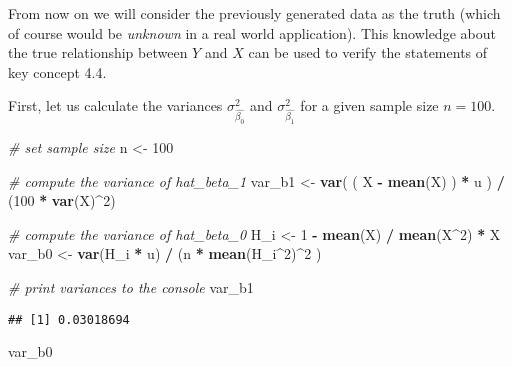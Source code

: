 \documentclass[]{book}
\newenvironment{Shaded}{\begin{snugshade}}{\end{snugshade}}
\newcommand{\KeywordTok}[1]{\textcolor[rgb]{0.13,0.29,0.53}{\textbf{#1}}}
\newcommand{\DecValTok}[1]{\textcolor[rgb]{0.00,0.00,0.81}{#1}}
\newcommand{\StringTok}[1]{\textcolor[rgb]{0.31,0.60,0.02}{#1}}
\newcommand{\CommentTok}[1]{\textcolor[rgb]{0.56,0.35,0.01}{\textit{#1}}}
\newcommand{\OperatorTok}[1]{\textcolor[rgb]{0.81,0.36,0.00}{\textbf{#1}}}
\newcommand{\NormalTok}[1]{#1}
\theoremstyle{definition}
\theoremstyle{definition}
\theoremstyle{definition}
\theoremstyle{remark}
\begin{document}
From now on we will consider the previously generated data as the truth
(which of course would be \emph{unknown} in a real world application).
This knowledge about the true relationship between \(Y\) and \(X\) can
be used to verify the statements of key concept 4.4.

First, let us calculate the variances \(\sigma^2_\hat{\beta_0}\) and
\(\sigma^2_\hat{\beta_1}\) for a given sample size \(n = 100\).

\begin{Shaded}
\begin{Highlighting}[]
\CommentTok{# set sample size}
\NormalTok{n <-}\StringTok{ }\DecValTok{100}

\CommentTok{# compute the variance of hat_beta_1}
\NormalTok{var_b1 <-}\StringTok{ }\KeywordTok{var}\NormalTok{( ( X }\OperatorTok{-}\StringTok{ }\KeywordTok{mean}\NormalTok{(X) ) }\OperatorTok{*}\StringTok{ }\NormalTok{u ) }\OperatorTok{/}\StringTok{ }\NormalTok{(}\DecValTok{100} \OperatorTok{*}\StringTok{ }\KeywordTok{var}\NormalTok{(X)}\OperatorTok{^}\DecValTok{2}\NormalTok{)}

\CommentTok{# compute the variance of hat_beta_0}
\NormalTok{H_i <-}\StringTok{ }\DecValTok{1} \OperatorTok{-}\StringTok{ }\KeywordTok{mean}\NormalTok{(X) }\OperatorTok{/}\StringTok{ }\KeywordTok{mean}\NormalTok{(X}\OperatorTok{^}\DecValTok{2}\NormalTok{) }\OperatorTok{*}\StringTok{ }\NormalTok{X}
\NormalTok{var_b0 <-}\StringTok{ }\KeywordTok{var}\NormalTok{(H_i }\OperatorTok{*}\StringTok{ }\NormalTok{u) }\OperatorTok{/}\StringTok{ }\NormalTok{(n }\OperatorTok{*}\StringTok{ }\KeywordTok{mean}\NormalTok{(H_i}\OperatorTok{^}\DecValTok{2}\NormalTok{)}\OperatorTok{^}\DecValTok{2}\NormalTok{ )}
\end{Highlighting}
\end{Shaded}

\begin{Shaded}
\begin{Highlighting}[]
\CommentTok{# print variances to the console}
\NormalTok{var_b1}
\end{Highlighting}
\end{Shaded}

\begin{verbatim}
## [1] 0.03018694
\end{verbatim}

\begin{Shaded}
\begin{Highlighting}[]
\NormalTok{var_b0}
\end{Highlighting}
\end{Shaded}
\end{document}
